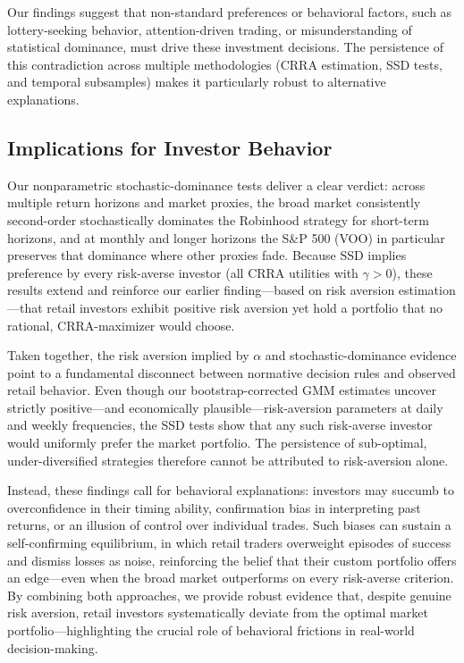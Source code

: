 Our findings suggest that non-standard preferences or behavioral factors, such as lottery-seeking behavior, attention-driven trading, or misunderstanding of statistical dominance, must drive these investment decisions. 
The persistence of this contradiction across multiple methodologies (CRRA estimation, SSD tests, and temporal subsamples) makes it particularly robust to alternative explanations.


\subsection{Implications for Investor Behavior}

Our nonparametric stochastic-dominance tests deliver a clear verdict: across multiple return horizons and market proxies, the broad market consistently second-order stochastically dominates the Robinhood strategy for short-term horizons, and at monthly and longer horizons the S\&P 500 (VOO) in particular preserves that dominance where other proxies fade.  
Because SSD implies preference by every risk-averse investor (all CRRA utilities with $\gamma>0$), these results extend and reinforce our earlier finding—based on risk aversion estimation—that retail investors exhibit positive risk aversion yet hold a portfolio that no rational, CRRA-maximizer would choose.  

Taken together, the risk aversion implied by $\alpha$ and stochastic-dominance evidence point to a fundamental disconnect between normative decision rules and observed retail behavior.  
Even though our bootstrap-corrected GMM estimates uncover strictly positive—and economically plausible—risk-aversion parameters at daily and weekly frequencies, 
the SSD tests show that any such risk-averse investor would uniformly prefer the market portfolio.  
The persistence of sub-optimal, under-diversified strategies therefore cannot be attributed to risk-aversion alone.

Instead, these findings call for behavioral explanations: investors may succumb to overconfidence in their timing ability, confirmation bias in interpreting past returns, or an illusion of control over individual trades.  
Such biases can sustain a self-confirming equilibrium, in which retail traders overweight episodes of success and dismiss losses as noise, reinforcing the belief that their custom portfolio offers an edge—even when the broad market outperforms on every risk-averse criterion.
By combining both approaches, we provide robust evidence that, despite genuine risk aversion, retail investors systematically deviate from the optimal market portfolio—highlighting the crucial role of behavioral frictions in real-world decision-making.  
